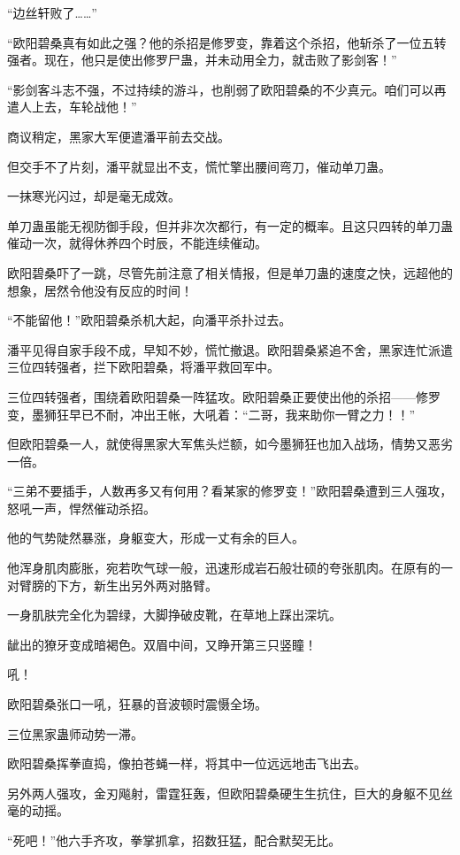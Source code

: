 \begin{this_body}
“边丝轩败了……”

“欧阳碧桑真有如此之强？他的杀招是修罗变，靠着这个杀招，他斩杀了一位五转强者。现在，他只是使出修罗尸蛊，并未动用全力，就击败了影剑客！”

“影剑客斗志不强，不过持续的游斗，也削弱了欧阳碧桑的不少真元。咱们可以再遣人上去，车轮战他！”

商议稍定，黑家大军便遣潘平前去交战。

但交手不了片刻，潘平就显出不支，慌忙擎出腰间弯刀，催动单刀蛊。

一抹寒光闪过，却是毫无成效。

单刀蛊虽能无视防御手段，但并非次次都行，有一定的概率。且这只四转的单刀蛊催动一次，就得休养四个时辰，不能连续催动。

欧阳碧桑吓了一跳，尽管先前注意了相关情报，但是单刀蛊的速度之快，远超他的想象，居然令他没有反应的时间！

“不能留他！”欧阳碧桑杀机大起，向潘平杀扑过去。

潘平见得自家手段不成，早知不妙，慌忙撤退。欧阳碧桑紧追不舍，黑家连忙派遣三位四转强者，拦下欧阳碧桑，将潘平救回军中。

三位四转强者，围绕着欧阳碧桑一阵猛攻。欧阳碧桑正要使出他的杀招——修罗变，墨狮狂早已不耐，冲出王帐，大吼着：“二哥，我来助你一臂之力！！”

但欧阳碧桑一人，就使得黑家大军焦头烂额，如今墨狮狂也加入战场，情势又恶劣一倍。

“三弟不要插手，人数再多又有何用？看某家的修罗变！”欧阳碧桑遭到三人强攻，怒吼一声，悍然催动杀招。

他的气势陡然暴涨，身躯变大，形成一丈有余的巨人。

他浑身肌肉膨胀，宛若吹气球一般，迅速形成岩石般壮硕的夸张肌肉。在原有的一对臂膀的下方，新生出另外两对胳臂。

一身肌肤完全化为碧绿，大脚挣破皮靴，在草地上踩出深坑。

龇出的獠牙变成暗褐色。双眉中间，又睁开第三只竖瞳！

吼！

欧阳碧桑张口一吼，狂暴的音波顿时震慑全场。

三位黑家蛊师动势一滞。

欧阳碧桑挥拳直捣，像拍苍蝇一样，将其中一位远远地击飞出去。

另外两人强攻，金刃飚射，雷霆狂轰，但欧阳碧桑硬生生抗住，巨大的身躯不见丝毫的动摇。

“死吧！”他六手齐攻，拳掌抓拿，招数狂猛，配合默契无比。


\end{this_body}
